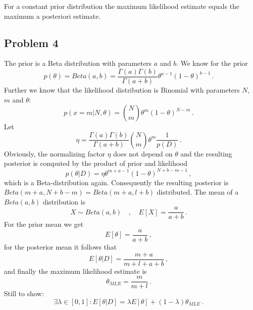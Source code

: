 \documentclass{scrartcl}
\begin{document}
For a constant prior distribution the maximum likelihood estimate equals the maximum a posteriori estimate.

\subsection{Problem 4}
The prior is a Beta distribution with parameters $a$ and $b$. We know for the prior
\begin{equation}
	p(\theta) = Beta(a,b) = \frac{\Gamma(a) \Gamma(b)}{\Gamma(a+b)} \theta^{a-1} (1-\theta)^{b-1} \, .
\end{equation}
Further we know that the likelihood distribution is Binomial with parameters $N$, $m$ and $\theta$:
\begin{equation}
	p(x=m | N, \theta) = \binom{N}{m} \theta^{m} (1-\theta)^{N-m} \, .
\end{equation}
Let 
\begin{equation}
	\eta = \frac{\Gamma(a) \Gamma(b)}{\Gamma(a+b)} \binom{N}{m} \theta^{m} \frac{1}{p(D)} \, .
\end{equation}
Obviously, the normalizing factor $\eta$ does not depend on $\theta$ and the resulting posterior is computed by the product of prior and likelihood
\begin{equation}
	p(\theta | D) = \eta \theta^{m+a-1}(1-\theta)^{N+b-m-1} \, ,
\end{equation}
which is a Beta-distribution again. Consequently the resulting posterior is $Beta(m+a, N+b-m) = Beta(m+a, l+b)$ distributed.
The mean of a $Beta(a,b)$ distribution is 
\begin{equation}
	X \sim Beta(a,b) \quad , \quad E\left[X\right] = \frac{a}{a+b} \, .
\end{equation}
For the prior mean we get
\begin{equation}
	E\left[\theta\right] = \frac{a}{a+b} \, ,
\end{equation}
for the posterior mean it follows that
\begin{equation}
	E\left[\theta | D\right] = \frac{m+a}{m+l+a+b} \, ,
\end{equation}
and finally the maximum likelihood estimate is 
\begin{equation}
	\theta_{MLE} = \frac{m}{m+l} \, .
\end{equation}
Still to show:
\begin{equation}
	\exists \lambda \in \left[0, 1\right]: E\left[\theta|D\right] = \lambda E\left[\theta\right] + (1-\lambda)\theta_{MLE} \, .
\end{equation}
\end{document}

